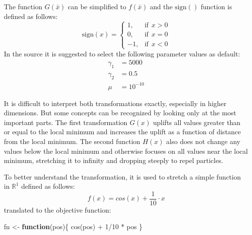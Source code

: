 \documentclass[
  oneside]{book}
\newenvironment{Shaded}{\begin{snugshade}}{\end{snugshade}}
\newcommand{\ControlFlowTok}[1]{\textcolor[rgb]{0.13,0.29,0.53}{\textbf{#1}}}
\newcommand{\DecValTok}[1]{\textcolor[rgb]{0.00,0.00,0.81}{#1}}
\newcommand{\FunctionTok}[1]{\textcolor[rgb]{0.00,0.00,0.00}{#1}}
\newcommand{\NormalTok}[1]{#1}
\newcommand{\OtherTok}[1]{\textcolor[rgb]{0.56,0.35,0.01}{#1}}
\newcommand{\SpecialCharTok}[1]{\textcolor[rgb]{0.00,0.00,0.00}{#1}}
\begin{document}
The function \(G(\bar{x})\) can be simplified to \(f(\bar{x})\) and the \(\text{sign}()\) function is defined as follows:
\[
  \text{sign}(x) = 
  \begin{cases}
    1, & \text{if}\ \ x > 0\\
    0, & \text{if}\ \ x = 0\\
    -1, & \text{if}\ \ x < 0
  \end{cases}
\]
In the source it is suggested to select the following parameter values as default:
\begin{align*}
  \gamma_1 &= 5000 \\
  \gamma_2 &= 0.5 \\
  \mu &= 10^{-10}
\end{align*}

It is difficult to interpret both transformations exactly, especially in higher dimensions. But some concepts can be recognized by looking only at the most important parts. The first transformation \(G(x)\) uplifts all values greater than or equal to the local minimum and increases the uplift as a function of distance from the local minimum. The second function \(H(x)\) also does not change any values below the local minimum and otherwise focuses on all values near the local minimum, stretching it to infinity and dropping steeply to repel particles.

To better understand the transformation, it is used to stretch a simple function in \(\mathbb{R}^1\) defined as follows:
\[
f(x) = cos(x)+\frac{1}{10}\cdot x
\]
translated to the objective function:

\begin{Shaded}
\begin{Highlighting}[]
\NormalTok{fn }\OtherTok{\textless{}{-}} \ControlFlowTok{function}\NormalTok{(pos)\{}
  \FunctionTok{cos}\NormalTok{(pos) }\SpecialCharTok{+} \DecValTok{1}\SpecialCharTok{/}\DecValTok{10} \SpecialCharTok{*}\NormalTok{ pos}
\NormalTok{\}}
\end{Highlighting}
\end{Shaded}
\end{document}
